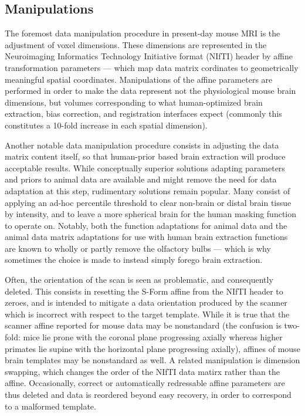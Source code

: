 \subsection{Manipulations}
The foremost data manipulation procedure in present-day mouse MRI is the adjustment of voxel dimensions.
These dimensions are represented in the Neuroimaging Informatics Technology Initiative format (NIfTI) header \cite{nifti} by affine transformation parameters --- which map data matrix cordinates to geometrically meaningful spatial coordinates.
Manipulations of the affine parameters are performed in order to make the data represent not the physiological mouse brain dimensions, but volumes corresponding to what human-optimized brain extraction, bias correction, and registration interfaces expect (commonly this constitutes a 10-fold increase in each spatial dimension).

Another notable data manipulation procedure consists in adjusting the data matrix content itself, so that human-prior based brain extraction will produce acceptable results.
While conceptually superior solutions adapting parameters and priors to animal data are available \cite{rbet,Oguz2014} and might remove the need for data adaptation at this step, rudimentary solutions remain popular.
Many consist of applying an ad-hoc percentile threshold to clear non-brain or distal brain tissue by intensity, and to leave a more spherical brain for the human masking function to operate on.
Notably, both the function adaptations for animal data and the animal data matrix adaptations for use with human brain extraction functions are known to wholly or partly remove the olfactory bulbs --- which is why sometimes the choice is made to instead simply forego brain extraction.

Often, the orientation of the scan is seen as problematic, and consequently deleted.
This consists in resetting the S-Form affine from the NIfTI header to zeroes, and is intended to mitigate a data orientation produced by the scanner which is incorrect with respect to the target template.
While it is true that the scanner affine reported for mouse data may be nonstandard (the confusion is two-fold: mice lie prone with the coronal plane progressing axially whereas higher primates lie supine with the horizontal plane progressing axially), affines of mouse brain templates may be nonstandard as well.
A related manipulation is dimension swapping, which changes the order of the NIfTI data matirx rather than the affine.
Occasionally, correct or automatically redressable affine parameters are thus deleted and data is reordered beyond easy recovery, in order to correspond to a malformed template.

